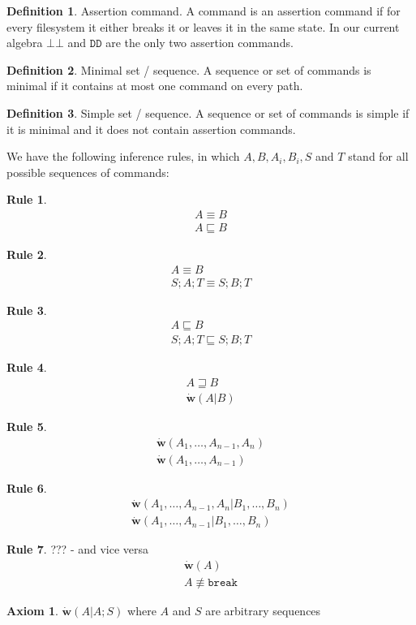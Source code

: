 \documentclass[12pt]{article}
\newcommand{\empt}{\bot}
\newcommand{\cbrk}{\mathtt{break}}
\newcommand{\fscommand}[2]{{#1#2}}
\newcommand{\fsregcommandchar}[1]{\mathtt{#1}}
\newcommand{\fsregcommand}[2]{\fscommand{\fsregcommandchar{#1}}{\fsregcommandchar{#2}}}
\newcommand{\cbb}{\fsregcommand{\empt}{\empt}}
\newcommand{\cdd}{\fsregcommand{D}{D}}
\newcommand{\eqext}{\sqsubseteq}
\newcommand{\eqnrw}{\sqsupseteq}
\newcommand{\nequiv}{\not\equiv}
\newcommand{\works}[1]{\dot{\mathbf{w}}({#1})}
\newcommand{\worksc}[2]{\dot{\mathbf{w}}({#1}|{#2})}
\newcommand{\infer}[2]{\begin{array}{c}{#1}\\\hline{#2}\end{array}}
\theoremstyle{definition}
\newtheorem{mydef}{Definition}
\newtheorem{myax}{Axiom}
\newtheorem{myrul}{Rule}
\begin{document}
\begin{mydef}{Assertion command.}
A command is an assertion command if
for every filesystem it either breaks it or leaves it in the same state.
In our current algebra $\cbb$ and $\cdd$ are the only two assertion commands.
\end{mydef}

\begin{mydef}{Minimal set / sequence.}
A sequence or set of commands is minimal if it contains at most one command on every path.
\end{mydef}

\begin{mydef}{Simple set / sequence.}
A sequence or set of commands is simple if it is minimal and it does not contain assertion commands.
\end{mydef}

We have the following inference rules, in which $A,B,A_i,B_i,S$ and $T$ stand for all possible sequences of commands:

\begin{myrul}
\[\infer{A\equiv B}{A\eqext B}\]
\end{myrul}

\begin{myrul}
\[\infer{A\equiv B}{S;A;T\equiv S;B;T}\]
\end{myrul}

\begin{myrul}
\[\infer{A\eqext B}{S;A;T\eqext S;B;T}\]
\end{myrul}

\begin{myrul}
\[\infer{A\eqnrw B}{\worksc{A}{B}}\]
\end{myrul}

\begin{myrul}
\[\infer{\works{A_1,\ldots,A_{n-1},A_n}}{\works{A_1,\ldots,A_{n-1}}}\]
\end{myrul}

\begin{myrul}
\[\infer{\worksc{A_1,\ldots,A_{n-1},A_n}{B_1,\ldots,B_n}}{\worksc{A_1,\ldots,A_{n-1}}{B_1,\ldots,B_n}}\]
\end{myrul}

\begin{myrul}{??? - and vice versa}
\[\infer{\works{A}}{A\nequiv\cbrk}\]
\end{myrul}


\begin{myax}\label{worksextpostfix}
$\worksc{A}{A;S}$ where $A$ and $S$ are arbitrary sequences
\end{myax}
\end{document}
